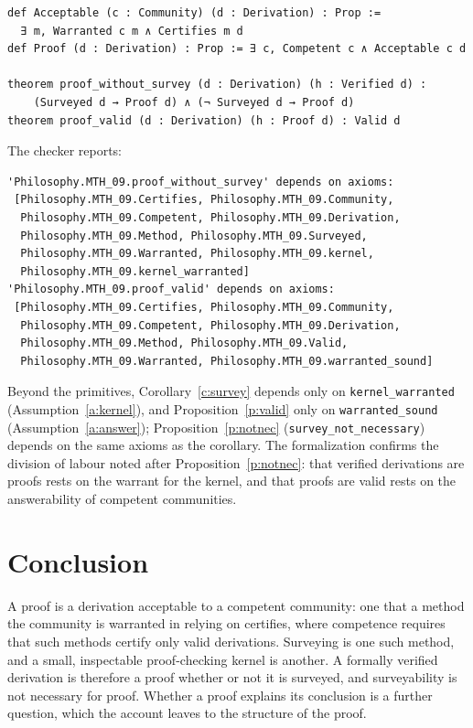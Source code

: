 \documentclass{situationist-preprint}
\begin{document}
\begin{lstlisting}
def Acceptable (c : Community) (d : Derivation) : Prop :=
  ∃ m, Warranted c m ∧ Certifies m d
def Proof (d : Derivation) : Prop := ∃ c, Competent c ∧ Acceptable c d

theorem proof_without_survey (d : Derivation) (h : Verified d) :
    (Surveyed d → Proof d) ∧ (¬ Surveyed d → Proof d)
theorem proof_valid (d : Derivation) (h : Proof d) : Valid d
\end{lstlisting}

The checker reports:

\begin{lstlisting}
'Philosophy.MTH_09.proof_without_survey' depends on axioms:
 [Philosophy.MTH_09.Certifies, Philosophy.MTH_09.Community,
  Philosophy.MTH_09.Competent, Philosophy.MTH_09.Derivation,
  Philosophy.MTH_09.Method, Philosophy.MTH_09.Surveyed,
  Philosophy.MTH_09.Warranted, Philosophy.MTH_09.kernel,
  Philosophy.MTH_09.kernel_warranted]
'Philosophy.MTH_09.proof_valid' depends on axioms:
 [Philosophy.MTH_09.Certifies, Philosophy.MTH_09.Community,
  Philosophy.MTH_09.Competent, Philosophy.MTH_09.Derivation,
  Philosophy.MTH_09.Method, Philosophy.MTH_09.Valid,
  Philosophy.MTH_09.Warranted, Philosophy.MTH_09.warranted_sound]
\end{lstlisting}

Beyond the primitives, Corollary~\ref{c:survey} depends only on \texttt{kernel\_warranted} (Assumption~\ref{a:kernel}), and Proposition~\ref{p:valid} only on \texttt{warranted\_sound} (Assumption~\ref{a:answer}); Proposition~\ref{p:notnec} (\texttt{survey\_not\_necessary}) depends on the same axioms as the corollary. The formalization confirms the division of labour noted after Proposition~\ref{p:notnec}: that verified derivations are proofs rests on the warrant for the kernel, and that proofs are valid rests on the answerability of competent communities.

\section{Conclusion}

A proof is a derivation acceptable to a competent community: one that a method the community is warranted in relying on certifies, where competence requires that such methods certify only valid derivations. Surveying is one such method, and a small, inspectable proof-checking kernel is another. A formally verified derivation is therefore a proof whether or not it is surveyed, and surveyability is not necessary for proof. Whether a proof explains its conclusion is a further question, which the account leaves to the structure of the proof.
\end{document}

